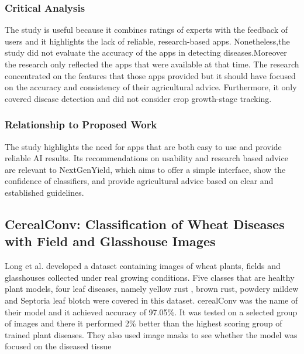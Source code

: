 \documentclass{FastFyp}
\begin{document}
\subsubsection{Critical Analysis}
The study is useful because it combines ratings of experts with the feedback of users and it highlights the lack of reliable, research-based apps. Nonetheless,the study did not evaluate the accuracy of the apps in detecting diseases.Moreover the research only reflected the apps that were available at that time. The research concentrated on the features that those apps provided but it should have focused on the accuracy and consistency of their agricultural advice. Furthermore, it only covered disease detection and did not consider crop growth-stage tracking.

\subsubsection{Relationship to Proposed Work}
The study highlights the need for apps that are both easy to use and provide reliable AI results. Its recommendations on usability and research based advice are relevant to NextGenYield, which aims to offer a simple interface, show the confidence of classifiers, and provide agricultural advice based on clear and established guidelines.


\subsection{CerealConv: Classification of Wheat Diseases with Field and Glasshouse Images}

Long et al. \cite{ref:Long:2023} developed a dataset containing images of wheat plants, fields and glasshouses collected under real growing conditions. Five classes that are healthy plant models, four leaf diseases, namely yellow rust , brown rust, powdery mildew and Septoria leaf blotch were covered in this dataset. cerealConv was the name of their model and it achieved accuracy of 97.05\%. It was tested on a selected group of images and there it performed 2\% better than the highest scoring group of trained plant diseases. They also used image masks to see whether the model was focused on the diseased tissue 
\end{document}
